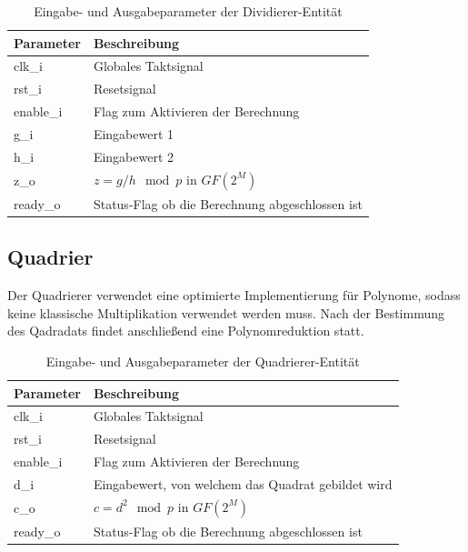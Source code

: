 \begin{table} [h]
	\centering 
	\begin{tabular}{ | p{3cm} | p{12cm} | }
		\hline
		\textbf{Parameter} & \textbf{Beschreibung}\\
		\hline
		clk\_i & Globales Taktsignal \\
		\hline
		rst\_i & Resetsignal \\
		\hline
		enable\_i & Flag zum Aktivieren der Berechnung \\
		\hline
		g\_i & Eingabewert 1 \\
		\hline
		h\_i & Eingabewert 2 \\
		\hline
		z\_o & $z = g/h \mod p$ in $GF(2^M)$ \\
		\hline
		ready\_o & Status-Flag ob die Berechnung abgeschlossen ist  \\
		\hline
		\hline
	\end{tabular}
	\caption{Eingabe- und Ausgabeparameter der Dividierer-Entität}
	\label{tab:vhdl-impl-divider-param}
\end{table}

\subsection{Quadrier}
Der Quadrierer verwendet eine optimierte Implementierung für Polynome, sodass keine klassische Multiplikation verwendet werden muss. Nach der Bestimmung des Qadradats findet anschließend eine Polynomreduktion statt. 

\begin{table} [h]
	\centering 
	\begin{tabular}{ | p{3cm} | p{12cm} | }
		\hline
		\textbf{Parameter} & \textbf{Beschreibung}\\
		\hline
		clk\_i & Globales Taktsignal \\
		\hline
		rst\_i & Resetsignal \\
		\hline
		enable\_i & Flag zum Aktivieren der Berechnung \\
		\hline
		d\_i & Eingabewert, von welchem das Quadrat gebildet wird \\
		\hline
		c\_o & $c = d^2 \mod p$ in $GF(2^M)$ \\
		\hline
		ready\_o & Status-Flag ob die Berechnung abgeschlossen ist  \\
		\hline
		\hline
	\end{tabular}
	\caption{Eingabe- und Ausgabeparameter der Quadrierer-Entität}
	\label{tab:vhdl-impl-squarer-param}
\end{table}

